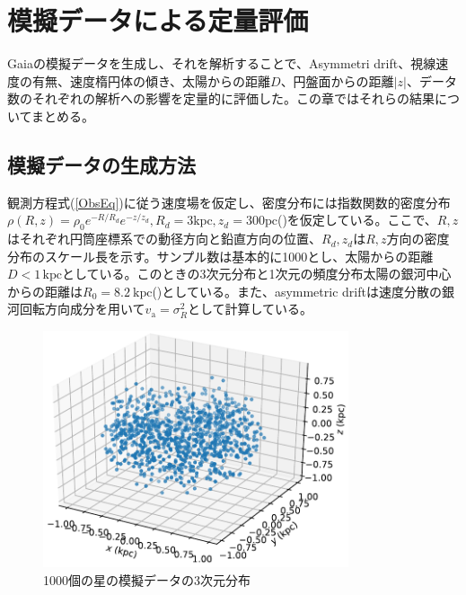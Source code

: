 \chapter{模擬データによる定量評価}


Gaiaの模擬データを生成し、それを解析することで、Asymmetri drift、視線速度の有無、速度楕円体の傾き、太陽からの距離$D$、円盤面からの距離$|z|$、データ数のそれぞれの解析への影響を定量的に評価した。この章ではそれらの結果についてまとめる。
\section{模擬データの生成方法}
観測方程式(\ref{ObsEq})に従う速度場を仮定し、密度分布には指数関数的密度分布$\rho(R,z) = \rho_0 e^{-R/R_d} e^{-z/z_d},R_d=3 \mathrm{kpc},z_d=300 \mathrm{pc}$(\cite{BH2016})を仮定している。ここで、$R,z$はそれぞれ円筒座標系での動径方向と鉛直方向の位置、$R_d,z_d$は$R,z$方向の密度分布のスケール長を示す。サンプル数は基本的に1000とし、太陽からの距離$D<1\,\mathrm{kpc}$としている。このときの3次元分布と1次元の頻度分布太陽の銀河中心からの距離は$R_0 = 8.2\ \mathrm{kpc}$(\cite{BH2016})としている。また、asymmetric driftは速度分散の銀河回転方向成分を用いて$v_{\mathrm{a}} = \sigma_R^2$として計算している。

%

\begin{figure}[htbp]
\begin{center}
	\includegraphics[width=9cm]{fig/3dMockData.pdf}
	\caption{1000個の星の模擬データの3次元分布} \label{dist3dMockData}
\end{center}
\end{figure}

